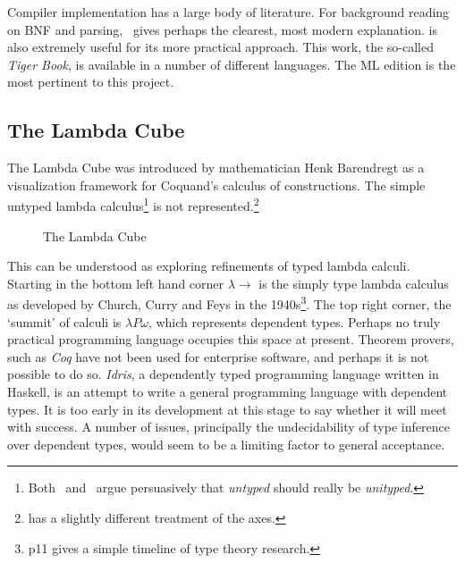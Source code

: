 \documentclass[12pt, a4paper]{report}
\begin{document}
Compiler implementation has a large body of literature. For background reading on \gls{BNF} and
parsing,~\cite{torc} gives perhaps the clearest, most modern explanation.
\cite{Appel:1997:MCI:248430} is also extremely useful for its more practical approach. This work,
the so-called \textit{Tiger Book}, is available in a number of different languages. The ML edition is
the most pertinent to this project.

\subsection{The Lambda Cube}
The Lambda Cube was introduced by mathematician Henk Barendregt as a visualization framework
for Coquand's calculus of constructions\cite{Barendregt:1993:LCT:162552.162561}. The simple
untyped lambda calculus\footnote{Both~\cite{Harper:2012:PFP:2431407} and~\cite{scott}
argue persuasively that \textit{untyped} should really be \textit{unityped}.} is not
represented.\footnote{\cite{Pierce:2002:TPL:509043} has a slightly different treatment of the axes.}

\begin{figure} %
    \centering
    \caption{The Lambda Cube}
    \label{fig:cube}
\end{figure}

This can be understood as exploring refinements of typed lambda calculi. Starting in the bottom
left hand corner $\lambda \rightarrow$ is the simply type lambda calculus as developed by Church,
Curry and Feys in the 1940s\footnote{\cite{Pierce:2002:TPL:509043} p11 gives a simple timeline
of type theory research.}. The top right corner, the `summit' of calculi is $\lambda P \omega$,
which represents \gls{dependent types}. Perhaps no truly practical programming language occupies this
space at present. Theorem provers, such as \textit{\gls{Coq}} have not been used for enterprise software,
and perhaps it is not possible to do so. \textit{Idris}, a dependently typed programming language
written in Haskell, is an attempt to write a general programming language with dependent types. It
is too early in its development at this stage to say whether it will meet with success. A number of
issues, principally the undecidability of type inference over dependent types, would seem to be a
limiting factor to general acceptance.
\end{document}
